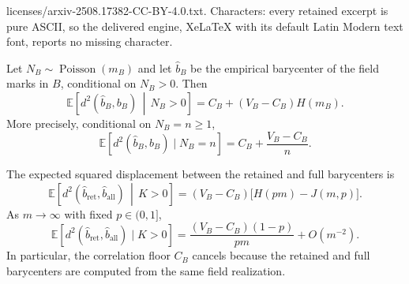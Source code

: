 \documentclass[10pt,a4paper]{amsart}
\newcommand{\EE}{\mathbb E}
\begin{document}
licenses/arxiv-2508.17382-CC-BY-4.0.txt. Characters: every retained excerpt is pure ASCII, so the delivered engine, XeLaTeX with its default Latin Modern text font, reports no missing character.
\begin{theorem}
\label{thm:correlated-field}
Let \(N_B\sim\operatorname{Poisson}(m_B)\) and let \(\widehat b_B\) be the empirical barycenter of the field marks in \(B\), conditional on \(N_B>0\).  Then
\begin{equation}
\label{eq:correlated-field-risk}
 \EE\!\left[d^2(\widehat b_B,b_B)\,\middle|\,N_B>0\right]
 =C_B+(V_B-C_B)H(m_B).
\end{equation}
More precisely, conditional on \(N_B=n\ge1\),
\begin{equation}
\label{eq:correlated-fixed-n}
 \EE[d^2(\widehat b_B,b_B)\mid N_B=n]
 =C_B+\frac{V_B-C_B}{n}.
\end{equation}
\end{theorem}

\begin{theorem}
\label{thm:thinning}
The expected squared displacement between the retained and full barycenters is
\begin{equation}
\label{eq:thinning-risk}
 \EE\!\left[d^2(\widehat b_{\mathrm{ret}},\widehat b_{\mathrm{all}})\,\middle|\,K>0\right]
 =(V_B-C_B)\bigl[H(pm)-J(m,p)\bigr].
\end{equation}
As \(m\to\infty\) with fixed \(p\in(0,1]\),
\begin{equation}
\label{eq:thinning-asymptotic}
 \EE[d^2(\widehat b_{\mathrm{ret}},\widehat b_{\mathrm{all}})\mid K>0]
 =\frac{(V_B-C_B)(1-p)}{pm}+O(m^{-2}).
\end{equation}
In particular, the correlation floor \(C_B\) cancels because the retained and full barycenters are computed from the same field realization.
\end{theorem}
\end{document}
